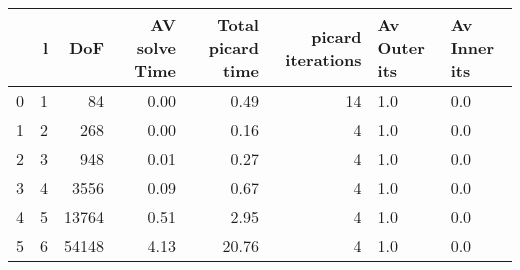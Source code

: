 \begin{tabular}{lrrrrrll}
\toprule
{} &  l &    DoF &  AV solve Time &  Total picard time &  picard iterations & Av Outer its & Av Inner its \\
\midrule
0 &  1 &     84 &           0.00 &               0.49 &                 14 &          1.0 &          0.0 \\
1 &  2 &    268 &           0.00 &               0.16 &                  4 &          1.0 &          0.0 \\
2 &  3 &    948 &           0.01 &               0.27 &                  4 &          1.0 &          0.0 \\
3 &  4 &   3556 &           0.09 &               0.67 &                  4 &          1.0 &          0.0 \\
4 &  5 &  13764 &           0.51 &               2.95 &                  4 &          1.0 &          0.0 \\
5 &  6 &  54148 &           4.13 &              20.76 &                  4 &          1.0 &          0.0 \\
\bottomrule
\end{tabular}
